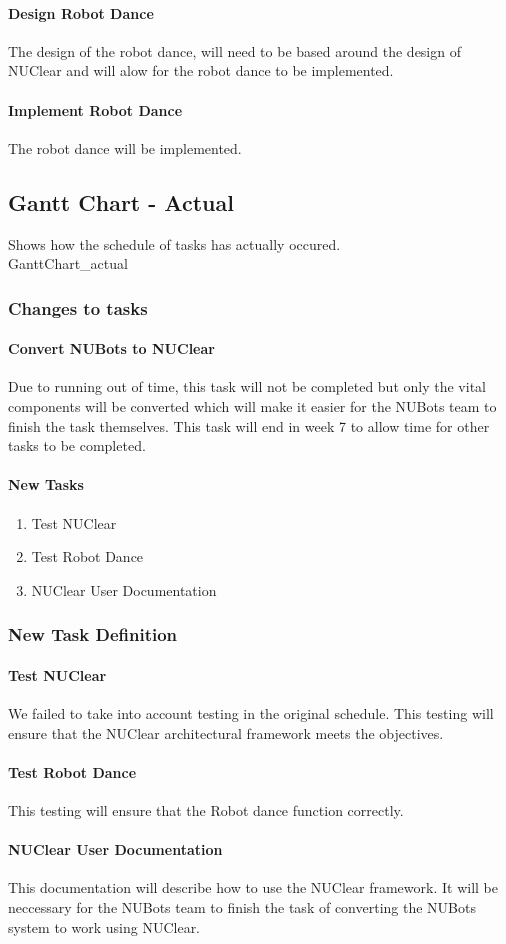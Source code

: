\documentclass[a4paper]{article}
\begin{document}
				\paragraph{Design Robot Dance}
					The design of the robot dance, will need to be based around the design of NUClear and will alow for the robot dance to be implemented.
				\paragraph{Implement Robot Dance}
					The robot dance will be implemented.
		\subsection{Gantt Chart - Actual}
			Shows how the schedule of tasks has actually occured. \\
			{GanttChart_actual}
			\subsubsection{Changes to tasks}
				\paragraph{Convert NUBots to NUClear}
					Due to running out of time, this task will not be completed but only the vital components will be converted which will make it easier for the NUBots team to finish the task themselves. This task will end in week 7 to allow time for other tasks to be completed.
				\paragraph{New Tasks}
					\begin{enumerate}
						\item Test NUClear
						\item Test Robot Dance
						\item NUClear User Documentation
					\end{enumerate}
			\subsubsection{New Task Definition}
				\paragraph{Test NUClear}
					We failed to take into account testing in the original schedule. This testing will ensure that the NUClear architectural framework meets the objectives.
				\paragraph{Test Robot Dance}
					This testing will ensure that the Robot dance function correctly.
				\paragraph{NUClear User Documentation}
					This documentation will describe how to use the NUClear framework. It will be neccessary for the NUBots team to finish the task of converting the NUBots system to work using NUClear.
					
\end{document}
